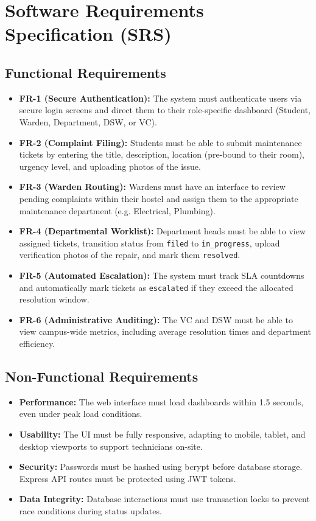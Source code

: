 \documentclass[12pt,a4paper]{article}
\begin{document}
\newpage
\section{Software Requirements Specification (SRS)}

\subsection{Functional Requirements}
\begin{itemize}
    \item \textbf{FR-1 (Secure Authentication):} The system must authenticate users via secure login screens and direct them to their role-specific dashboard (Student, Warden, Department, DSW, or VC).
    \item \textbf{FR-2 (Complaint Filing):} Students must be able to submit maintenance tickets by entering the title, description, location (pre-bound to their room), urgency level, and uploading photos of the issue.
    \item \textbf{FR-3 (Warden Routing):} Wardens must have an interface to review pending complaints within their hostel and assign them to the appropriate maintenance department (e.g. Electrical, Plumbing).
    \item \textbf{FR-4 (Departmental Worklist):} Department heads must be able to view assigned tickets, transition status from \texttt{filed} to \texttt{in\_progress}, upload verification photos of the repair, and mark them \texttt{resolved}.
    \item \textbf{FR-5 (Automated Escalation):} The system must track SLA countdowns and automatically mark tickets as \texttt{escalated} if they exceed the allocated resolution window.
    \item \textbf{FR-6 (Administrative Auditing):} The VC and DSW must be able to view campus-wide metrics, including average resolution times and department efficiency.
\end{itemize}

\subsection{Non-Functional Requirements}
\begin{itemize}
    \item \textbf{Performance:} The web interface must load dashboards within 1.5 seconds, even under peak load conditions.
    \item \textbf{Usability:} The UI must be fully responsive, adapting to mobile, tablet, and desktop viewports to support technicians on-site.
    \item \textbf{Security:} Passwords must be hashed using bcrypt before database storage. Express API routes must be protected using JWT tokens.
    \item \textbf{Data Integrity:} Database interactions must use transaction locks to prevent race conditions during status updates.
\end{itemize}
\end{document}
